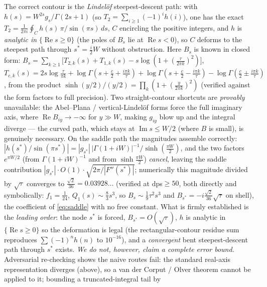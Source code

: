 The correct contour is the \emph{Lindel\"of} steepest-descent path: with
$h(s)=W^{2s}g_s/\Gamma(2s+1)$ (so $T_2=\sum_{i\ge1}(-1)^i h(i)$), one has the exact
$T_2=\tfrac{1}{2\pi i}\oint_C h(s)\,\pi/\!\sin(\pi s)\,ds$, $C$ encircling the positive
integers, and $h$ is \emph{analytic in} $\{\operatorname{Re}s\ge0\}$ (the poles of
$B_s$ lie at $\operatorname{Re}s<0$), so $C$ deforms to the steepest path through
$s^\ast=\tfrac i2 W$ without obstruction. Here $B_s$ is known in closed form:
$B_s=\sum_{k\ge1}\bigl[T_{2,k}(s)+T_{1,k}(s)-s\log(1+(\tfrac{\tau}{2\pi k})^2)\bigr]$,
$T_{c,k}(s)=2s\log\tfrac{\tau}{\pi k}+\log\Gamma(s{+}\tfrac c2{+}\tfrac{i\pi k}{\tau})+\log\Gamma(s{+}\tfrac c2{-}\tfrac{i\pi k}{\tau})-\log\Gamma(\tfrac c2{\pm}\tfrac{i\pi k}{\tau})$,
from the product $\sinh(y/2)/(y/2)=\prod_k(1+(\tfrac{y}{2\pi k})^2)$
\textup(verified against the form factors to full precision\textup).
Two straight-contour shortcuts are \emph{provably} unavailable: the Abel--Plana /
vertical-Lindel\"of forms force the full imaginary axis, where $\operatorname{Re}B_{iy}\to-\infty$
for $y\gg W$, making $g_{iy}$ blow up and the integral diverge --- the curved path,
which stays at $\operatorname{Im}s\le W/2$ (where $B$ is small), is genuinely necessary.
On the saddle path the magnitudes assemble correctly: $|h(s^\ast)/\!\sin(\pi s^\ast)|
=|g_{s^\ast}|\,|\Gamma(1{+}iW)|^{-1}/\sinh(\tfrac{\pi W}{2})$, and the two factors
$e^{\pi W/2}$ \textup(from $\Gamma(1{+}iW)^{-1}$ and from $\sinh\tfrac{\pi W}{2}$\textup)
\emph{cancel}, leaving the saddle contribution $|g_{s^\ast}|\cdot O(1)\cdot\sqrt{2\pi/|F''(s^\ast)|}$;
numerically this magnitude divided by $\sqrt\tau$ converges to $\tfrac{\sqrt2}{36}=0.03928\ldots$
\textup(verified at dps$\ge50$, both directly and symbolically: $f_1=\tfrac1{24}$, $Q_1(s){\sim}\tfrac83 s^3$,
so $B_s{\sim}\tfrac19\tau^2 s^3$ and $B_{s^\ast}=-i\tfrac{\sqrt2}{36}\sqrt\tau$ on shell\textup), the
coefficient of \eqref{eq:saddle} with no free constant. What is firmly established is the
\emph{leading order}: the node $s^\ast$ is forced, $B_{s^\ast}=O(\sqrt\tau)$, $h$ is analytic in
$\{\operatorname{Re}s\ge0\}$ so the deformation is legal \textup(the rectangular-contour residue sum
reproduces $\sum(-1)^n h(n)$ to $10^{-16}$\textup), and a \emph{convergent} bent steepest-descent
path through $s^\ast$ exists. \emph{We do not, however, claim a complete error bound.} Adversarial
re-checking shows the naive routes fail: the standard real-axis representation diverges \textup(above\textup),
so a van der Corput / Olver theorem cannot be applied to it; bounding a truncated-integral tail by
